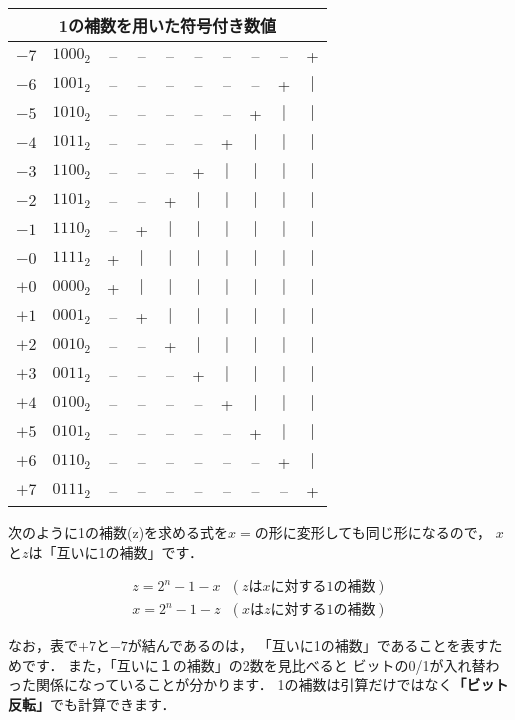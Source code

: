 \newcommand{\h}{$\vert$}
\begin{center}
\begin{tabular}{ | l | l c c c c c c c c |}
\hline
\multicolumn{10}{|c|}{\bf 1の補数を用いた符号付き数値} \\
\hline
$-7$  & $1000_2$ &--&--&--&--&--&--&--& +\\
$-6$  & $1001_2$ &--&--&--&--&--&--&+ &\h\\
$-5$  & $1010_2$ &--&--&--&--&--&+ &\h&\h\\
$-4$  & $1011_2$ &--&--&--&--&+ &\h&\h&\h\\
$-3$  & $1100_2$ &--&--&--&+ &\h&\h&\h&\h\\
$-2$  & $1101_2$ &--&--&+ &\h&\h&\h&\h&\h\\
$-1$  & $1110_2$ &--&+ &\h&\h&\h&\h&\h&\h\\
$-0$  & $1111_2$ &+ &\h&\h&\h&\h&\h&\h&\h\\
$+0$  & $0000_2$ &+ &\h&\h&\h&\h&\h&\h&\h\\
$+1$  & $0001_2$ &--&+ &\h&\h&\h&\h&\h&\h\\
$+2$  & $0010_2$ &--&--&+ &\h&\h&\h&\h&\h\\
$+3$  & $0011_2$ &--&--&--&+ &\h&\h&\h&\h\\
$+4$  & $0100_2$ &--&--&--&--&+ &\h&\h&\h\\
$+5$  & $0101_2$ &--&--&--&--&--&+ &\h&\h\\
$+6$  & $0110_2$ &--&--&--&--&--&--&+ &\h\\
$+7$  & $0111_2$ &--&--&--&--&--&--&--& +\\
\hline
\end{tabular}
\end{center}

次のように1の補数(z)を求める式を$x=$の形に変形しても同じ形になるので，
$x$と$z$は「互いに1の補数」です．

{\small
\begin{eqnarray}
z = 2^n - 1 - x ~~~ (zはxに対する1の補数) \nonumber\\
x = 2^n - 1 - z ~~~ (xはzに対する1の補数) \nonumber
\end{eqnarray}
}


なお，表で$+7$と$-7$が結んであるのは，
「互いに1の補数」であることを表すためです．
また，「互いに１の補数」の2数を見比べると
ビットの0/1が入れ替わった関係になっていることが分かります．
1の補数は引算だけではなく{\bf 「ビット反転」}でも計算できます．


